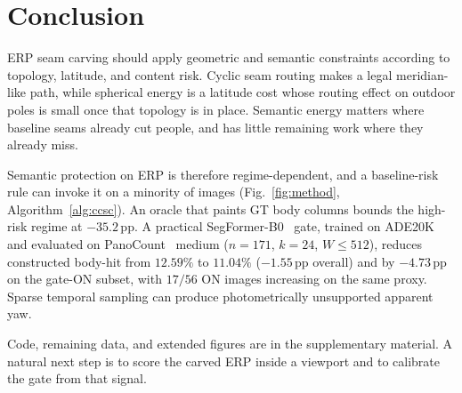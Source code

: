 \section{Conclusion}
\label{sec:conclusion}

ERP seam carving should apply geometric and semantic constraints
according to topology, latitude, and content risk. Cyclic seam
routing makes a legal meridian-like path, while spherical energy
is a latitude cost whose routing effect on outdoor poles is
small once that topology is in place. Semantic energy matters
where baseline seams already cut people, and has little
remaining work where they already miss.

Semantic protection on ERP is therefore regime-dependent, and a
baseline-risk rule can invoke it on a minority of images
(Fig.~\ref{fig:method}, Algorithm~\ref{alg:ccsc}). An oracle that
paints GT body columns bounds the high-risk regime at
$-35.2$\,pp. A practical SegFormer-B0~\cite{xie2021segformer}
gate, trained on {ADE20K}~\cite{zhou2017ade20k} and evaluated on
PanoCount~\cite{arbi2025panocount} medium ($n=171$, $k=24$,
$W\le 512$), reduces constructed body-hit from $12.59\%$ to
$11.04\%$ ($-1.55$\,pp overall) and by $-4.73$\,pp on the
gate-ON subset, with $17/56$ ON images increasing on the same
proxy. Sparse temporal sampling can produce photometrically
unsupported apparent yaw.

Code, remaining data, and extended figures are in the
supplementary material. A natural next step is to score the
carved ERP inside a viewport and to calibrate the gate from
that signal.
